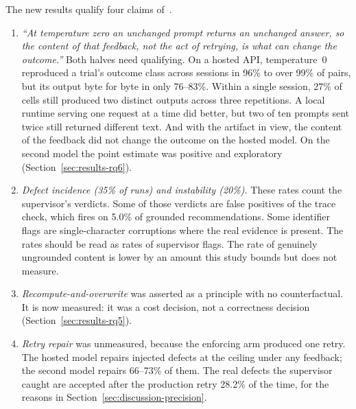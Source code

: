 The new results qualify four claims of~\citet{hoang2026eas}.
\begin{enumerate}
\item \emph{``At temperature zero an unchanged prompt returns an unchanged
  answer, so the content of that feedback, not the act of retrying, is what can
  change the outcome.''}
  Both halves need qualifying. On a hosted API, temperature~0 reproduced a
  trial's outcome class across sessions in 96\% to over 99\% of pairs, but its
  output byte for byte in only 76--83\%. Within a single session, 27\% of 
  cells still produced two distinct outputs across three repetitions. A local
  runtime serving one request at a time did better, but two of ten prompts sent
  twice still returned different text. And with the artifact in view, the
  content of the feedback did not change the outcome on the hosted model. On the
  second model the point estimate was positive and exploratory (Section~\ref{sec:results-rq6}).
\item \emph{Defect incidence (35\% of runs) and instability (20\%).} These
  rates count the supervisor's verdicts. Some of those verdicts are false
  positives of the trace check, which fires on 5.0\% of grounded
  recommendations. Some identifier flags are single-character corruptions where
  the real evidence is present. The rates should be read as rates of supervisor
  flags. The rate of genuinely ungrounded content is lower by an amount this
  study bounds but does not measure.
\item \emph{Recompute-and-overwrite} was asserted as a principle with no
  counterfactual. It is now measured: it was a cost decision, not a correctness
  decision (Section~\ref{sec:results-rq5}).
\item \emph{Retry repair} was unmeasured, because the enforcing arm produced one
  retry. The hosted model repairs injected defects at the ceiling under any
  feedback; the second model repairs 66--73\% of them. The
  real defects the supervisor caught are accepted after the production retry
  28.2\% of the time, for the reasons in
  Section~\ref{sec:discussion-precision}.
\end{enumerate}

